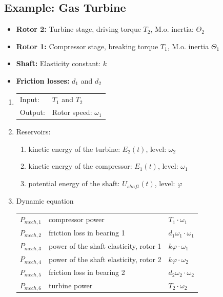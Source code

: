 \documentclass[10pt,a4paper]{scrartcl}
\begin{document}
\begin{multicols*}{3}
\begin{enumerate}
\end{enumerate}


\subsection{Example: Gas Turbine}\label{GasTurbine}


\scriptsize
\begin{itemize}
\item\textbf{Rotor 2:} Turbine stage, driving torque $T_2$, M.o. inertia: $\Theta_2$
\item\textbf{Rotor 1:} Compressor stage, breaking torque $T_1$, M.o. inertia $\Theta_1$
\item\textbf{Shaft:} Elasticity constant: $k$
\item\textbf{Friction losses:} $d_1$ and $d_2$
\end{itemize}
\normalsize


\begin{enumerate}
\item \begin{tabular}{ll}Input: & $T_1$ and $T_2$\\ Output: & Rotor speed: $\omega_1$\end{tabular}
\item Reservoirs:
\begin{enumerate}
\item kinetic energy of the turbine: $E_2(t)$, level: $\omega_2$
\item kinetic energy of the compressor: $E_1(t)$, level: $\omega_1$
\item potential energy of the shaft: $U_{shaft}(t)$, level: $\varphi$
\end{enumerate}
\item Dynamic equation

\small \begin{tabular}{l@{ = }l@{ = }l}
$P_{mech,1}$&compressor power& $T_1\cdot \omega_1$\\
$P_{mech,2}$&friction loss in bearing 1& $d_1\omega_1\cdot \omega_1$\\
$P_{mech,3}$&power of the shaft elasticity, rotor 1&$k\varphi\cdot\omega_1$\\
$P_{mech,4}$&power of the shaft elasticity, rotor 2&$k\varphi\cdot\omega_2$\\
$P_{mech,5}$&friction loss in bearing 2&$d_2\omega_2\cdot\omega_2$\\
$P_{mech,6}$&turbine power&$T_2\cdot\omega_2$
\end{tabular}
\normalsize


\end{enumerate}
\end{multicols*}
\end{document}
